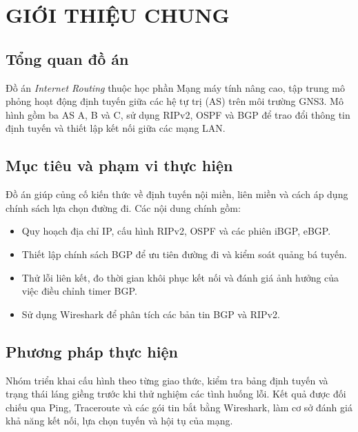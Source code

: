 \chapter{GIỚI THIỆU CHUNG}

\section{Tổng quan đồ án}

Đồ án \textit{Internet Routing} thuộc học phần Mạng máy tính nâng cao,
tập trung mô phỏng hoạt động định tuyến giữa các hệ tự trị (AS)
trên môi trường GNS3. Mô hình gồm ba AS A, B và C,
sử dụng RIPv2, OSPF và BGP để trao đổi thông tin định tuyến
và thiết lập kết nối giữa các mạng LAN.

\section{Mục tiêu và phạm vi thực hiện}

Đồ án giúp củng cố kiến thức về định tuyến nội miền, liên miền
và cách áp dụng chính sách lựa chọn đường đi. Các nội dung chính gồm:
\begin{itemize}
    \item Quy hoạch địa chỉ IP, cấu hình RIPv2, OSPF và các phiên iBGP, eBGP.
    \item Thiết lập chính sách BGP để ưu tiên đường đi và kiểm soát quảng bá tuyến.
    \item Thử lỗi liên kết, đo thời gian khôi phục kết nối
    và đánh giá ảnh hưởng của việc điều chỉnh timer BGP.
    \item Sử dụng Wireshark để phân tích các bản tin BGP và RIPv2.
\end{itemize}

\section{Phương pháp thực hiện}

Nhóm triển khai cấu hình theo từng giao thức, kiểm tra bảng định tuyến
và trạng thái láng giềng trước khi thử nghiệm các tình huống lỗi.
Kết quả được đối chiếu qua Ping, Traceroute và các gói tin bắt bằng Wireshark,
làm cơ sở đánh giá khả năng kết nối, lựa chọn tuyến và hội tụ của mạng.
